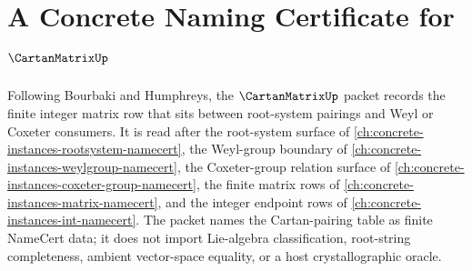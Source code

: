 \chapter{A Concrete Naming Certificate for $\CartanMatrixUp$}
\label{ch:concrete-instances-cartan-matrix-namecert}

Following Bourbaki and Humphreys, the $\CartanMatrixUp$ packet records the finite integer matrix row that sits between root-system pairings and Weyl or Coxeter consumers. It is read after the root-system surface of \autoref{ch:concrete-instances-rootsystem-namecert}, the Weyl-group boundary of \autoref{ch:concrete-instances-weylgroup-namecert}, the Coxeter-group relation surface of \autoref{ch:concrete-instances-coxeter-group-namecert}, the finite matrix rows of \autoref{ch:concrete-instances-matrix-namecert}, and the integer endpoint rows of \autoref{ch:concrete-instances-int-namecert}. The packet names the Cartan-pairing table as finite NameCert data; it does not import Lie-algebra classification, root-string completeness, ambient vector-space equality, or a host crystallographic oracle.


